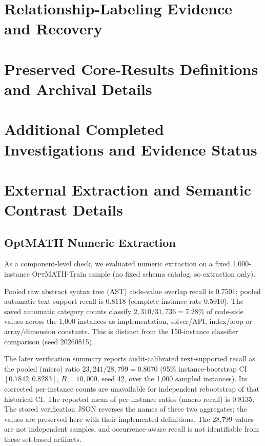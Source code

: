 \documentclass[pdflatex,sn-basic,Numbered]{sn-jnl}
\begin{document}
\section{Relationship-Labeling Evidence and Recovery}



\section{Preserved Core-Results Definitions and Archival Details}

\section{Additional Completed Investigations and Evidence Status}
\label{app:additional-evidence}


\section{External Extraction and Semantic Contrast Details}
\subsection{OptMATH Numeric Extraction}
\label{app:extraction-details}\label{subsec:exp_external_validation}
As a component-level check, we evaluated numeric extraction on a fixed 1,000-instance \textsc{OptMATH}-Train sample \cite{lu2025optmath} (no fixed schema catalog, so extraction only).

Pooled raw abstract syntax tree (AST) code-value overlap recall is $0.7501$; pooled automatic text-support recall is $0.8118$ (complete-instance rate $0.5910$). The saved automatic category counts classify $2{,}310/31{,}736=7.28\%$ of code-side values across the 1,000 instances as implementation, solver/API, index/loop or array/dimension constants. This is distinct from the 150-instance classifier comparison (seed 20260815).

The later verification summary reports audit-calibrated text-supported recall as the pooled (micro) ratio $23{,}241/28{,}799=0.8070$ (95\% instance-bootstrap CI $[0.7842,0.8283]$, $B=10{,}000$, seed 42, over the 1,000 sampled instances). Its corrected per-instance counts are unavailable for independent rebootstrap of that historical CI. The reported mean of per-instance ratios (macro recall) is $0.8135$. The stored verification JSON reverses the names of these two aggregates; the values are preserved here with their implemented definitions. The 28,799 values are not independent samples, and occurrence-aware recall is not identifiable from these set-based artifacts. 
\end{document}
